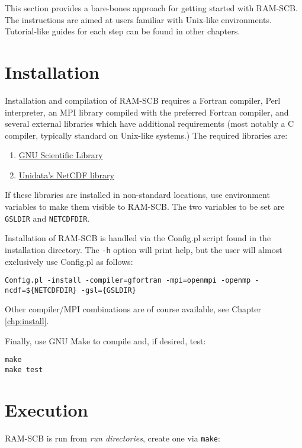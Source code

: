 This section provides a bare-bones approach for getting started with RAM-SCB. The instructions are aimed at users familiar with Unix-like environments. Tutorial-like guides for each step can be found in other chapters.

\section{Installation}

Installation and compilation of RAM-SCB requires a Fortran compiler, Perl interpreter, an MPI library compiled with the preferred Fortran compiler, and several external libraries which have additional requirements (most notably a C compiler, typically standard on Unix-like systems.)  The required libraries are:

\begin{enumerate}
\item{\href{https://www.gnu.org/software/gsl}{GNU Scientific Library}}
\item{\href{http://www.unidata.ucar.edu/downloads/netcdf/ftp/netcdf-4.0.1.tar.gz}{Unidata's NetCDF library}}
\end{enumerate}

If these libraries are installed in non-standard locations, use environment variables to make them visible to RAM-SCB. The two variables to be set are {\tt GSLDIR} and {\tt NETCDFDIR}.

Installation of RAM-SCB is handled via the Config.pl script found in the installation directory. The {\tt -h} option will print help, but the user will almost exclusively use Config.pl as follows:

\begin{verbatim}
Config.pl -install -compiler=gfortran -mpi=openmpi -openmp -ncdf=${NETCDFDIR} -gsl={GSLDIR}
\end{verbatim}

Other compiler/MPI combinations are of course available, see Chapter \ref{chp:install}.

Finally, use GNU Make to compile and, if desired, test:

\begin{verbatim}
make
make test
\end{verbatim}

\section{Execution}

RAM-SCB is run from \textit{run directories}, create one via {\tt make}:

